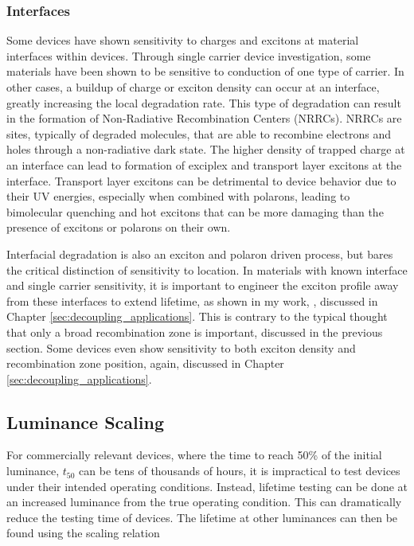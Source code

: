 \documentclass[../thesis.tex]{subfiles}
\begin{document}
\subsubsection{Interfaces}

Some devices have shown sensitivity to charges and excitons at material interfaces within devices.\supercite{Hershey2016,Wang2013}
Through single carrier device investigation, some materials have been shown to be sensitive to conduction of one type of carrier.\supercite{Aziz1999}
In other cases, a buildup of charge or exciton density can occur at an interface, greatly increasing the local degradation rate.\supercite{Kondakov2003,Matsumura2003}
This type of degradation can result in the formation of Non-Radiative Recombination Centers (NRRCs).\supercite{Kondakov2007b,Kondakov2008,Kondakov2003,Kondakov2007d}
NRRCs are sites, typically of degraded molecules, that are able to recombine electrons and holes through a non-radiative dark state.
The higher density of trapped charge at an interface can lead to formation of exciplex and transport layer excitons at the interface.  \supercite{Wang2013}
Transport layer excitons can be detrimental to device behavior due to their UV energies, especially when combined with polarons, leading to bimolecular quenching and hot excitons that can be more damaging than the presence of excitons or polarons on their own.\supercite{Lee2017}

Interfacial degradation is also an exciton and polaron driven process, but bares the critical distinction of sensitivity to location.  
In materials with known interface and single carrier sensitivity, it is important to engineer the exciton profile away from these interfaces to extend lifetime, as shown in my work, \textcite{Hershey2016}, discussed in Chapter \ref{sec:decoupling_applications}.
This is contrary to the typical thought that only a broad recombination zone is important, discussed in the previous section.
Some devices even show sensitivity to both exciton density and recombination zone position, again, discussed in Chapter \ref{sec:decoupling_applications}.







\subsection{Luminance Scaling}\label{sec:luminance_scaling}
For commercially relevant devices, where the time to reach 50\% of the initial luminance, $t_{50}$ can be tens of thousands of hours, it is impractical to test devices under their intended operating conditions.
Instead, lifetime testing can be done at an increased luminance from the true operating condition.\supercite{Scholz2015}
This can dramatically reduce the testing time of devices.
The lifetime at other luminances can then be found using the scaling relation
\end{document}
